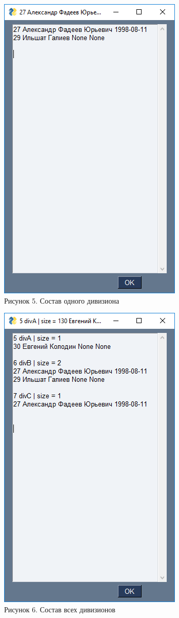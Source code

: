 \documentclass[a4paper,12pt,preview]{report} %
\begin{document}
	
	\begin{center}
		\includegraphics{onediv.PNG} \\
		Рисунок 5. Состав одного дивизиона
	\end{center}
	
	
	\begin{center}
		\includegraphics{alldivs.PNG} \\
		Рисунок 6. Состав всех дивизионов
	\end{center}
	
\end{document}
